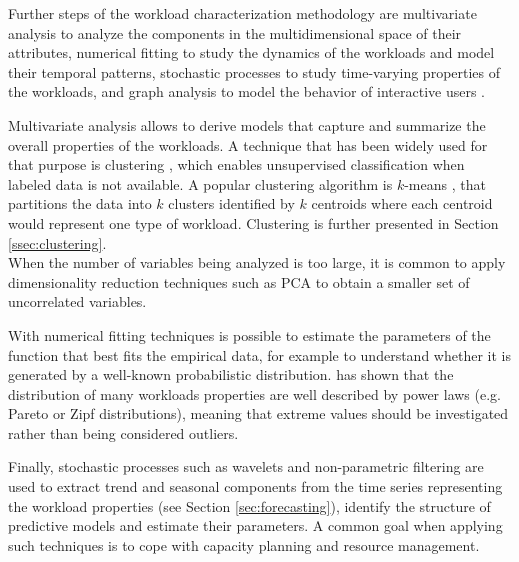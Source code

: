 \documentclass[a4paper, 12pt]{article} %
\begin{document}
	Further steps of the workload characterization methodology are multivariate analysis to analyze the components in the multidimensional space of their attributes, numerical fitting to study the dynamics of the workloads and model their temporal patterns, stochastic processes to study time-varying properties of the workloads, and graph analysis to model the behavior of interactive users \cite{WorkloadCharacterization}.
	
	Multivariate analysis allows to derive models that capture and summarize the overall properties of the workloads. A technique that has been widely used for that purpose is clustering \cite{ClusteringSurvey}, which enables unsupervised classification when labeled data is not available. A popular clustering algorithm is $k$-means \cite{ClusteringSurvey}, that partitions the data into $k$ clusters identified by $k$ centroids where each centroid would represent one type of workload. Clustering is further presented in Section \ref{ssec:clustering}.\\
	When the number of variables being analyzed is too large, it is common to apply dimensionality reduction techniques such as PCA \cite{PCA} to obtain a smaller set of uncorrelated variables.
	
	With numerical fitting techniques is possible to estimate the parameters of the function that best fits the empirical data, for example to understand whether it is generated by a well-known probabilistic distribution. \cite{WorkloadsPowerLaw} has shown that the distribution of many workloads properties are well described by power laws (e.g. Pareto or Zipf distributions), meaning that extreme values should be investigated rather than being considered outliers.
	
	Finally, stochastic processes such as wavelets and non-parametric filtering are used to extract trend and seasonal components from the time series representing the workload properties (see Section \ref{sec:forecasting}), identify the structure of predictive models and estimate their parameters. A common goal when applying such techniques is to cope with capacity planning and resource management.
	
\end{document}
